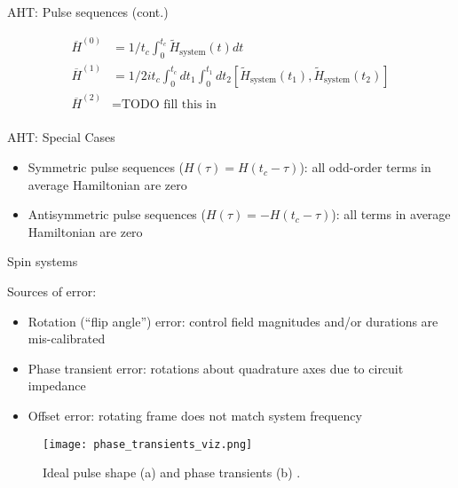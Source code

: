 \documentclass{beamer}
\begin{document}
\begin{frame}{AHT: Pulse sequences (cont.)}

\begin{align*}
    \overline{H}^{(0)} &= 1/t_c \int_0^{t_c}
        \widetilde{H}_\text{system}(t) dt \\
    \overline{H}^{(1)} &= 1/2it_c \int_0^{t_c} dt_1 \int_0^{t_1} dt_2
        [\widetilde{H}_\text{system}(t_1),
         \widetilde{H}_\text{system}(t_2)] \\
     \overline{H}^{(2)} &= \text{TODO fill this in} \\
\end{align*}

\end{frame}

\begin{frame}{AHT: Special Cases}

\begin{itemize}

\item
  Symmetric pulse sequences (\(H(\tau) = H(t_c - \tau)\)): all odd-order
  terms in average Hamiltonian are zero
\item
  Antisymmetric pulse sequences (\(H(\tau) = - H(t_c - \tau)\)): all
  terms in average Hamiltonian are zero
\end{itemize}
\end{frame}

\begin{frame}{Spin systems}


Sources of error:
\begin{itemize}
    \item Rotation (``flip angle'') error: control field magnitudes and/or durations are mis-calibrated
    \item Phase transient error: rotations about quadrature axes due to circuit impedance
    \item Offset error: rotating frame does not match system frequency
\end{itemize}

\begin{figure}
\centering
\texttt{[image: phase\_transients\_viz.png]}
\caption{Ideal pulse shape (a) and phase transients (b) \cite{1976ii}.}
\end{figure}

\end{frame}
\end{document}
